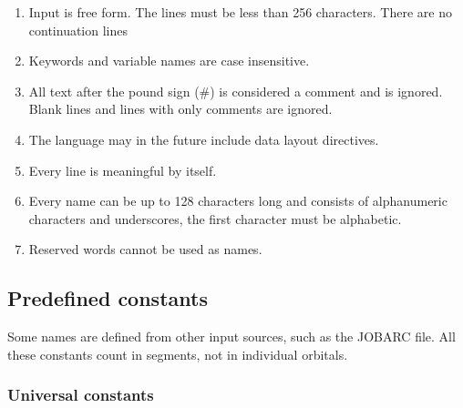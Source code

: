 \documentclass[12pt]{article}
\begin{document}
\begin{enumerate} 
\item Input is free form. The lines must be less than 256 characters. There are no 
continuation lines

\item Keywords and variable names are case insensitive.

\item All text after the pound sign (\#) is considered a comment and is ignored. 
Blank lines and lines with only comments are ignored.

\item The language may in the future include data layout directives.

\item Every line is meaningful by itself.

\item Every name can be up to 128 characters long and consists of alphanumeric characters 
and underscores, the first character must be alphabetic.

\item Reserved words cannot be used as names.
\end{enumerate} 

\subsection{Predefined constants}

Some names are defined from other input sources, such as the JOBARC file. All these 
constants count in segments, not in individual orbitals.

\subsubsection{Universal constants}
\end{document}
